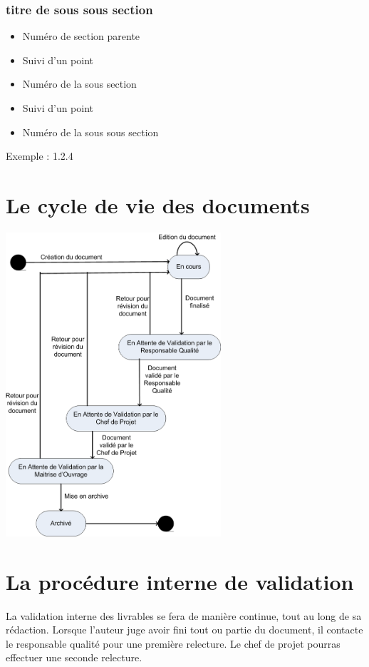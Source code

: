    \subsubsection{titre de sous sous section}
   \begin{itemize}
      \item Numéro de section parente
      \item Suivi d'un point
      \item Numéro de la sous section
      \item Suivi d'un point
      \item Numéro de la sous sous section
   \end{itemize}
        Exemple : 1.2.4

\section{Le cycle de vie des documents}

\begin{center}
\includegraphics[width=0.6\textwidth]{img/cycleVie.png}
\end{center}

\section{La procédure interne de validation}

La validation interne des livrables se fera de manière continue, tout au long de sa rédaction.
Lorsque l’auteur juge avoir fini tout ou partie du document, il contacte le responsable qualité pour une première relecture. Le chef de projet pourras effectuer une seconde relecture.

